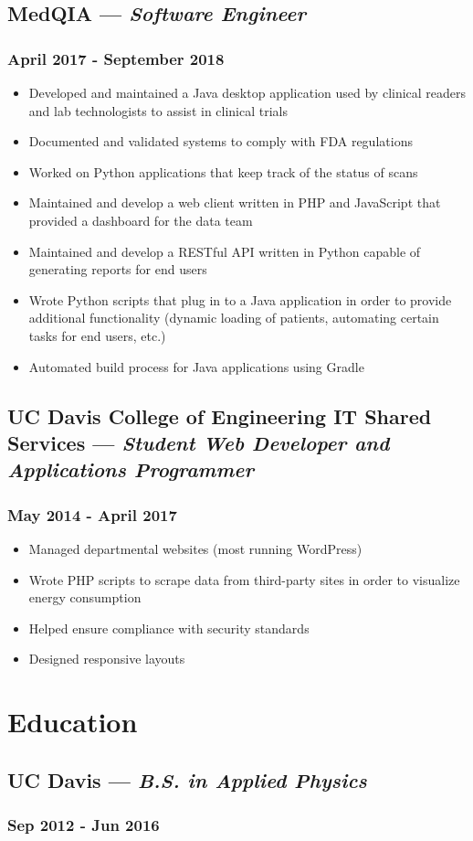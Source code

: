 \documentclass{article}
\begin{document}
\begin{minipage}[t]{.8\textwidth}
\subsection*{MedQIA --- \textit{Software Engineer}}
\subsubsection*{April 2017 - September 2018}
\begin{itemize}
    \item Developed and maintained a Java desktop application used by clinical readers and lab technologists to assist in clinical trials
    \item Documented and validated systems to comply with FDA regulations
    \item Worked on Python applications that keep track of the status of scans
    \item Maintained and develop a web client written in PHP and JavaScript that provided a dashboard for the data team
    \item Maintained and develop a RESTful API written in Python capable of generating reports for end users
    \item Wrote Python scripts that plug in to a Java application in order to provide additional functionality (dynamic loading of patients, automating certain tasks for end users, etc.)
    \item Automated build process for Java applications using Gradle
\end{itemize}
\subsection*{UC Davis College of Engineering IT Shared Services --- \textit{Student Web Developer and Applications Programmer}}
\subsubsection*{May 2014 - April 2017}
\begin{itemize}
    \item Managed departmental websites (most running WordPress)
    \item Wrote PHP scripts to scrape data from third-party sites in order to visualize energy consumption
    \item Helped ensure compliance with security standards
    \item Designed responsive layouts
\end{itemize}
\section*{Education}
\subsection*{UC Davis --- \textit{B.S. in Applied Physics}}
\subsubsection*{Sep 2012 - Jun 2016}
\end{minipage}%
\end{document}
